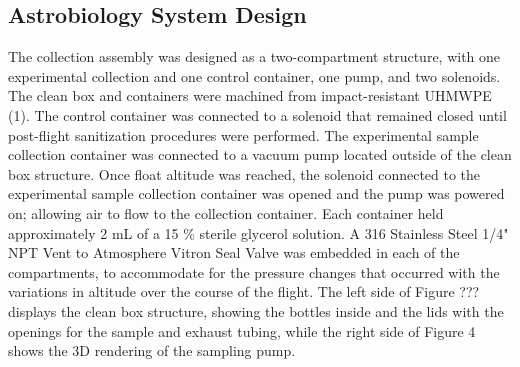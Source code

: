 \subsection{Astrobiology System Design}
\label{sec:Astrobiology Design}
The collection assembly was designed as a two-compartment structure, with one experimental collection and one control container, one pump, and two solenoids. The clean box and containers were machined from impact-resistant UHMWPE (1). 
The control container was connected to a solenoid that remained closed until post-flight sanitization procedures were performed. The experimental sample collection container was connected to a vacuum pump located outside of the clean box structure. Once float altitude was reached, the solenoid connected to the experimental sample collection container was opened and the pump was powered on; allowing air to flow to the collection container. Each container held approximately 2 mL of a 15 \% sterile glycerol solution. A 316 Stainless Steel 1/4" NPT Vent to Atmosphere Vitron Seal Valve was embedded in each of the compartments, to accommodate for the pressure changes that occurred with the variations in altitude over the course of the flight. The left side of Figure ??? displays the clean box structure, showing the bottles inside and the lids with the openings for the sample and exhaust tubing, while the right side of Figure 4 shows the 3D rendering of the sampling pump.